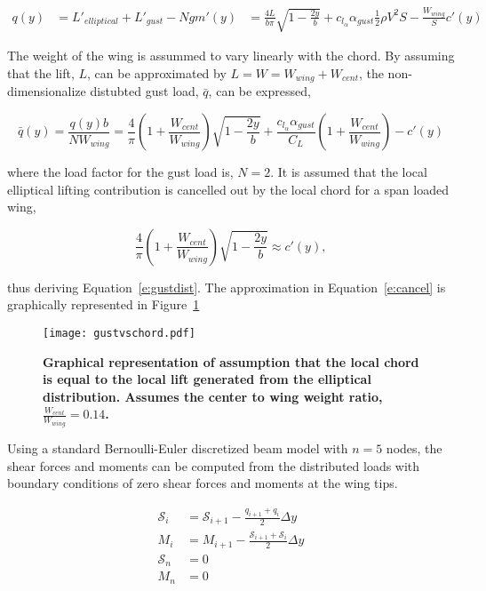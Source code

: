 \documentclass[]{aiaa-tc}%
\begin{document}
\begin{align}
    \label{e:ellpgustload}
    q(y) &= L'_{elliptical} + L'_{gust} - Ngm'(y)
    \label{e:allpgustload2}
    &= \frac{4L}{b\pi} \sqrt{1 - \frac{2y}{b}} + c_{l_{\alpha}} \alpha_{gust} \frac{1}{2} \rho V^2 S - \frac{W_{wing}}{S} c'(y)
\end{align}

The weight of the wing is assummed to vary linearly with the chord. By assuming that the lift, $L$, can be approximated by $L=W=W_{wing} + W_{cent}$, the non-dimensionalize distubted gust load, $\bar{q}$, can be expressed, 

\begin{equation}
    \label{e:ellpgustload3}
    \bar{q}(y) = \frac{q(y)b}{NW_{wing}} = \frac{4}{\pi}\left( 1 + \frac{W_{cent}}{W_{wing}}\right) \sqrt{1-\frac{2y}{b}} + \frac{c_{l_{\alpha}}\alpha_{gust}}{C_L} \left( 1 + \frac{W_{cent}}{W_{wing}}\right) - c'(y)
\end{equation}

where the load factor for the gust load is, $N=2$. It is assumed that the local elliptical lifting contribution is cancelled out by the local chord for a span loaded wing,

\begin{equation}
    \label{e:cancel}
    \frac{4}{\pi}\left( 1 + \frac{W_{cent}}{W_{wing}}\right) \sqrt{1-\frac{2y}{b}} \approx c'(y),
\end{equation}

thus deriving Equation~\ref{e:gustdist}. The approximation in Equation~\ref{e:cancel} is graphically represented in Figure~\ref{f:gustvschord}

\begin{figure}[H]
	\begin{center}
	\texttt{[image: gustvschord.pdf]}
    \caption{ \textbf{ Graphical representation of assumption that the local chord is equal to the local lift generated from the elliptical distribution. Assumes the center to wing weight ratio, $\frac{W_{cent}}{W_{wing}} = 0.14$. }}
	\label{f:gustvschord}
	\end{center}
\end{figure}

Using a standard Bernoulli-Euler discretized beam model with $n=5$ nodes, the shear forces and moments can be computed from the distributed loads with boundary conditions of zero shear forces and moments at the wing tips.\cite{bending}

\begin{align}
    \label{e:shear}
    \mathcal{S}_i &= \mathcal{S}_{i+1} - \frac{q_{i+1} + q_i}{2}\Delta y \\
    \label{e:moment}
    M_i &= M_{i+1} - \frac{\mathcal{S}_{i+1} + \mathcal{S}_i}{2}\Delta y \\
    \label{e:shearboundary}
    \mathcal{S}_n &= 0 \\
    \label{e:momentboundary}
    M_n &= 0
\end{align}
\end{document}

